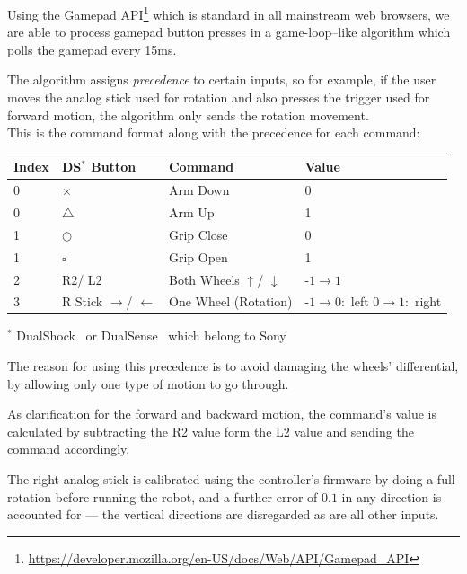 \documentclass[a4paper,12pt]{article}
\newcommand{\sz}{\text{-}}
\begin{document}
Using the Gamepad API\footnote{\url{https://developer.mozilla.org/en-US/docs/Web/API/Gamepad_API}} which is standard in all mainstream web browsers, we are able to process gamepad button presses in a game-loop--like algorithm which polls the gamepad every 15ms.

The algorithm assigns \textit{precedence} to certain inputs, so for example, if the user moves the analog stick used for rotation and also presses the trigger used for forward motion, the algorithm only sends the rotation movement.\\
This is the command format along with the precedence for each command:
\begin{center}
    \bgroup
    \def\arraystretch{1.5}
    {
    \begin{tabular}{|l|l|l|p{6em}|}
        \hline
        \textbf{Index} & \textbf{DS$^*$ Button} & \textbf{Command} & \textbf{Value}\\
        \hline
        0 & $\times$ & Arm Down & 0 \\
        \hline
        0 & $\triangle$ & Arm Up & 1 \\
        \hline
        1 & $\bigcirc$ & Grip Close & 0 \\
        \hline
        1 & $\square$ & Grip Open & 1 \\
        \hline
        2 & R2/ L2  & Both Wheels $\uparrow$/ $\downarrow$ & $\sz1 \rightarrow 1$ \\
        \hline
        3 & R Stick $\rightarrow$/ $\leftarrow$ & One Wheel (Rotation) & $\sz1 \rightarrow 0 :$ left \newline $0 \rightarrow 1:$ right\\
        \hline
    \end{tabular}}
    \egroup

    \footnotesize{$^*$ DualShock \textregistered\ or DualSense \textregistered\ which belong to Sony \texttrademark}\\
\end{center}

The reason for using this precedence is to avoid damaging the wheels' differential, by allowing only one type of motion to go through.

As clarification for the forward and backward motion, the command's value is calculated by subtracting the R2 value form the L2 value and sending the command accordingly.

The right analog stick is calibrated using the controller's firmware by doing a full rotation before running the robot, and a further error of $0.1$ in any direction is accounted for --- the vertical directions are disregarded as are all other inputs.
\end{document}
